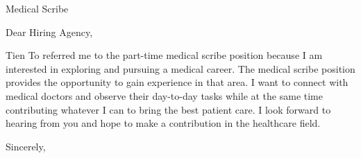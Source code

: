 \documentclass[12pt]{letter}
\begin{document}
\begin{letter}{Medical Scribe}

\opening{Dear Hiring Agency,}

Tien To referred me to the part-time medical scribe position because
I am interested in exploring and pursuing a medical career. The medical scribe
position provides the opportunity to gain experience in that area. I want
to connect with medical doctors and observe their day-to-day tasks while
at the same time contributing whatever I can to bring the best patient care.
I look forward to hearing from you and hope to make a contribution in the healthcare
field.

\thispagestyle{uciletter}

\closing{Sincerely,}

\end{letter}
\end{document}

